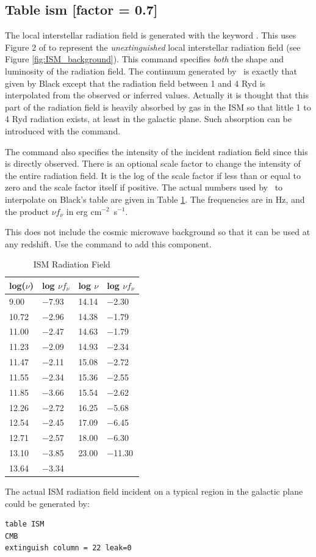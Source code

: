 \subsection{Table ism [factor = 0.7]}

The local interstellar radiation field is generated with the keyword
.
This uses Figure 2 of \citet{Black1987} to represent the
\emph{unextinguished}
local interstellar radiation field (see Figure \ref{fig:ISM_background}).  This command specifies
\emph{both} the shape and luminosity of the radiation field.
The continuum
generated by \Cloudy\ is exactly that given by Black except that the radiation
field between 1 and 4 Ryd is interpolated from the observed or inferred
values.  Actually it is thought that this part of the radiation field is
heavily absorbed by gas in the ISM so that little 1 to 4 Ryd radiation
exists, at least in the galactic plane.  Such absorption can be introduced
with the  command.

The  command also specifies the intensity
of the incident radiation field since this is directly observed.
There is an optional scale
factor to change the intensity of the entire radiation field.
It is the
log of the scale factor if less than or equal to zero and the scale factor
itself if positive.
The actual numbers used by \Cloudy\ to interpolate on
Black's table are given in Table \ref{tab:ISM_Black}.
The frequencies are in Hz, and the
product $\nu f_\nu$ in erg cm$^{-2}$~s$^{-1}$.

This does not include the cosmic microwave background so that it can be used at any redshift.
Use the 
command to add this component.

\begin{table}
\centering
\caption{ISM Radiation Field}
\label{tab:ISM_Black}\begin{tabular}{llll}\hline
log($\nu$)& log $\nu f_\nu$& log $\nu$& log $\nu f_{\nu}$\\
\hline
9.00& $-$7.93& 14.14& $-$2.30\\
10.72& $-$2.96& 14.38& $-$1.79\\
11.00& $-$2.47& 14.63& $-$1.79\\
11.23& $-$2.09& 14.93& $-$2.34\\
11.47& $-$2.11& 15.08& $-$2.72\\
11.55& $-$2.34& 15.36& $-$2.55\\
11.85& $-$3.66& 15.54& $-$2.62\\
12.26& $-$2.72& 16.25& $-$5.68\\
12.54& $-$2.45& 17.09& $-$6.45\\
12.71& $-$2.57& 18.00& $-$6.30\\
13.10& $-$3.85& 23.00& $-$11.30\\
13.64& $-$3.34\\
\hline
\end{tabular}
\end{table}
The actual ISM radiation field incident on a typical region in the galactic plane could be generated by:
\begin{verbatim}
table ISM
CMB
extinguish column = 22 leak=0
\end{verbatim}

